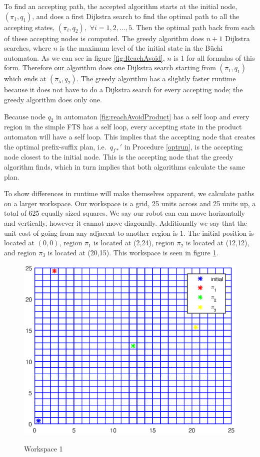 To find an accepting path, the accepted algorithm starts at the initial node, $(\pi_1,q_1)$, and does a first Dijkstra search to find the optimal path to all the accepting states, $(\pi_i,q_2),$ $\forall i = 1,2,\dots,5$. Then the optimal path back from each of these accepting nodes is computed.   
The greedy algorithm does $n+1$ Dijkstra searches, where $n$ is the maximum level of the initial state in the B\"{u}chi automaton. As we can see in figure \ref{fig:ReachAvoid}, $n$ is 1 for all formulas of this form. Therefore our algorithm does one Dijkstra search starting from $(\pi_1,q_1)$ which ends at $(\pi_5,q_2)$. The greedy algorithm has a slightly faster runtime because it does not have to do a Dijkstra search for every accepting node; the greedy algorithm does only one. 

Because node $q_2$ in automaton \ref{fig:reachAvoidProduct} has a self loop and every region in the simple FTS has a self loop, every accepting state in the product automaton will have a self loop. This implies that the accepting node that creates the optimal prefix-suffix plan, i.e.\ $q_{f*}'$ in Procedure \ref{optrun}, is the accepting node closest to the initial node. This is the accepting node that the greedy algorithm finds, which in turn implies that both algorithms calculate the same plan. 

To show differences in runtime will make themselves apparent, we calculate paths on a larger workspace. Our workspace is a grid, 25 units across and 25 units up, a total of 625 equally sized squares. We say our robot can can move horizontally and vertically, however it cannot move diagonally. Additionally we say that the unit cost of going from any adjacent to another region is 1. The initial position is located at $(0,0)$, region $\pi_1$ is located at (2,24), region $\pi_2$ is located at (12,12), and region $\pi_3$ is located at (20,15). This workspace is seen in figure \ref{fig:workspace}.

\begin{figure}[!htb]
\centering
\includegraphics[scale=1]{workspace.eps}
\label{fig:workspace}
\caption{Workspace 1}
\end{figure}


